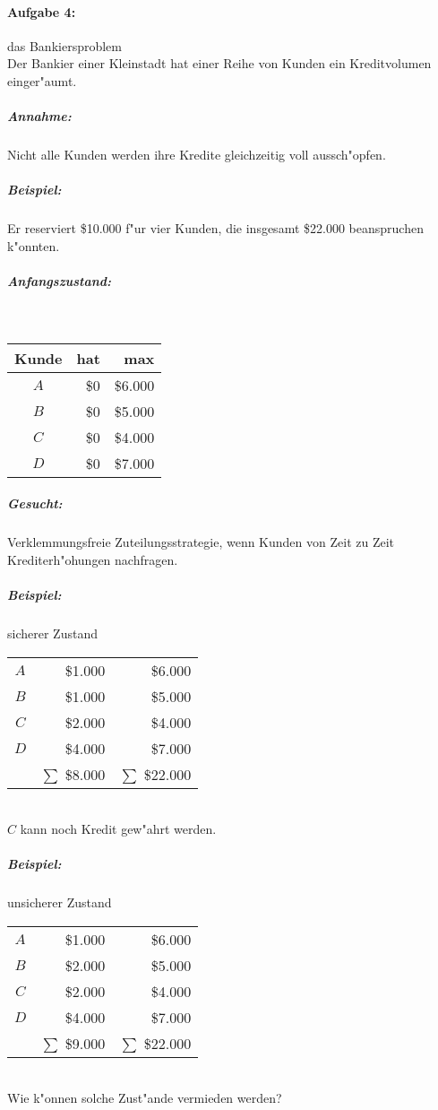 \documentclass[titlepage,12pt, bibtotoc, liststotoc]{scrreprt}
\begin{document}
\paragraph{Aufgabe 4:}
das Bankiersproblem\\
Der Bankier einer Kleinstadt hat einer Reihe von Kunden ein Kreditvolumen
einger"aumt.
\subparagraph{Annahme:}
Nicht alle Kunden werden ihre Kredite gleichzeitig voll aussch"opfen.
\subparagraph{Beispiel:}
Er reserviert \$10.000 f"ur vier Kunden, die insgesamt \$22.000 beanspruchen
k"onnten.
\subparagraph{Anfangszustand:}\ \\
\begin{tabular}{c|r|r}
	Kunde & hat & max \\ \hline
	$A$ & \$0 & \$6.000\\
	$B$ & \$0 & \$5.000\\
	$C$ & \$0 & \$4.000\\
	$D$ & \$0 & \$7.000
\end{tabular}
\subparagraph{Gesucht:}
Verklemmungsfreie Zuteilungsstrategie, wenn Kunden von Zeit zu Zeit
Krediterh"ohungen nachfragen.
\subparagraph{Beispiel:}
sicherer Zustand\\
\begin{tabular}{c|r|r}
	$A$ & \$1.000 & \$6.000\\
	$B$ & \$1.000 & \$5.000\\
	$C$ & \$2.000 & \$4.000\\
	$D$ & \$4.000 & \$7.000\\
	& $\sum$ \$8.000 & $\sum$ \$22.000
\end{tabular}\\
$C$ kann noch Kredit gew"ahrt werden.
\subparagraph{Beispiel:}
unsicherer Zustand\\
\begin{tabular}{c|r|r}
	$A$ & \$1.000 & \$6.000\\
	$B$ & \$2.000 & \$5.000\\
	$C$ & \$2.000 & \$4.000\\
	$D$ & \$4.000 & \$7.000\\
	& $\sum$ \$9.000 & $\sum$ \$22.000
\end{tabular}\\
Wie k"onnen solche Zust"ande vermieden werden?
\end{document}

